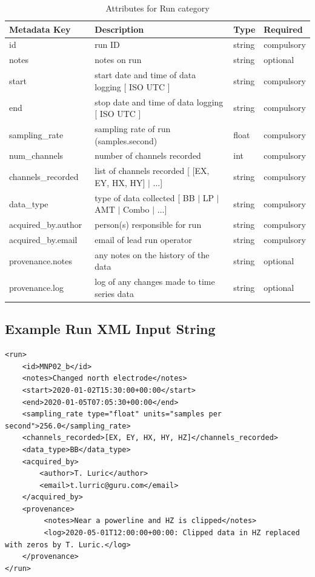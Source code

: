 \documentclass{article}
\begin{document}
\begin{table}[htb!]
    \caption[Attributes for Run]{Attributes for Run category}
    \begin{tabular}{|l|p{3in}|l|l|}
        \hline
        \textbf{Metadata Key} & \textbf{Description} & \textbf{Type} & \textbf{Required} \\ \hline
        id\ & run ID & string & compulsory \\ \hline
        notes\ & notes on run & string & optional \\ \hline
        start\ & start date and time of data logging [ ISO UTC ] & string & compulsory \\ \hline
        end\ & stop date and time of data logging [ ISO UTC ] & string & compulsory \\ \hline
        sampling\_rate\ & sampling rate of run (samples.second) & float & compulsory \\ \hline
        num\_channels\ & number of channels recorded & int & compulsory \\ \hline
        channels\_recorded\ & list of channels recorded [ [EX, EY, HX, HY] $|$ ...] & string & compulsory \\ \hline
        data\_type \ & type of data collected [ BB $|$ LP $|$ AMT $|$ Combo $|$ ...] & string & compulsory \\ \hline
        acquired\_by.author\ & person(s) responsible for run & string & compulsory \\ \hline
        acquired\_by.email\ & email of lead run operator & string & compulsory \\ \hline
        provenance.notes\ & any notes on the history of the data & string & optional \\ \hline
        provenance.log\ & log of any changes made to time series data & string & optional \\ \hline
    \end{tabular}
    \label{tab:run}
\end{table}

\subsection{Example Run XML Input String}

\begin{verbatim}
<run>
    <id>MNP02_b</id>
    <notes>Changed north electrode</notes>
    <start>2020-01-02T15:30:00+00:00</start>
    <end>2020-01-05T07:05:30+00:00</end>
    <sampling_rate type="float" units="samples per second">256.0</sampling_rate>
    <channels_recorded>[EX, EY, HX, HY, HZ]</channels_recorded>
    <data_type>BB</data_type>
    <acquired_by>
        <author>T. Luric</author>
        <email>t.lurric@guru.com</email>
    </acquired_by>
    <provenance>
         <notes>Near a powerline and HZ is clipped</notes>
         <log>2020-05-01T12:00:00+00:00: Clipped data in HZ replaced with zeros by T. Luric.</log>
    </provenance>
</run>
\end{verbatim}
\end{document}
